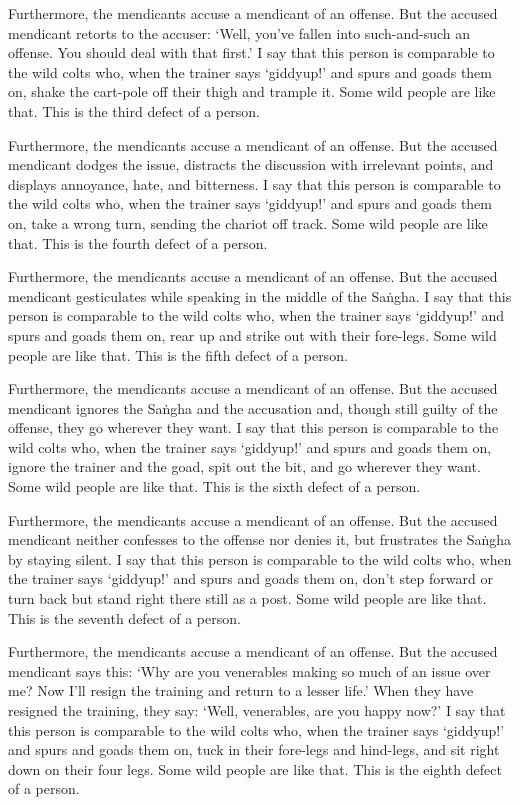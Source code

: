 \documentclass[12pt,openany]{book}%
\begin{document}
Furthermore, the mendicants accuse a mendicant of an offense. But the accused mendicant retorts to the accuser: ‘Well, you’ve fallen into such-and-such an offense. You should deal with that first.’ I say that this person is comparable to the wild colts who, when the trainer says ‘giddyup!’ and spurs and goads them on, shake the cart-pole off their thigh and trample it. Some wild people are like that. This is the third defect of a person. 

Furthermore, the mendicants accuse a mendicant of an offense. But the accused mendicant dodges the issue, distracts the discussion with irrelevant points, and displays annoyance, hate, and bitterness. I say that this person is comparable to the wild colts who, when the trainer says ‘giddyup!’ and spurs and goads them on, take a wrong turn, sending the chariot off track. Some wild people are like that. This is the fourth defect of a person. 

Furthermore, the mendicants accuse a mendicant of an offense. But the accused mendicant gesticulates while speaking in the middle of the \textsanskrit{Saṅgha}. I say that this person is comparable to the wild colts who, when the trainer says ‘giddyup!’ and spurs and goads them on, rear up and strike out with their fore-legs. Some wild people are like that. This is the fifth defect of a person. 

Furthermore, the mendicants accuse a mendicant of an offense. But the accused mendicant ignores the \textsanskrit{Saṅgha} and the accusation and, though still guilty of the offense, they go wherever they want. I say that this person is comparable to the wild colts who, when the trainer says ‘giddyup!’ and spurs and goads them on, ignore the trainer and the goad, spit out the bit, and go wherever they want. Some wild people are like that. This is the sixth defect of a person. 

Furthermore, the mendicants accuse a mendicant of an offense. But the accused mendicant neither confesses to the offense nor denies it, but frustrates the \textsanskrit{Saṅgha} by staying silent. I say that this person is comparable to the wild colts who, when the trainer says ‘giddyup!’ and spurs and goads them on, don’t step forward or turn back but stand right there still as a post. Some wild people are like that. This is the seventh defect of a person. 

Furthermore, the mendicants accuse a mendicant of an offense. But the accused mendicant says this: ‘Why are you venerables making so much of an issue over me? Now I’ll resign the training and return to a lesser life.’ When they have resigned the training, they say: ‘Well, venerables, are you happy now?’ I say that this person is comparable to the wild colts who, when the trainer says ‘giddyup!’ and spurs and goads them on, tuck in their fore-legs and hind-legs, and sit right down on their four legs. Some wild people are like that. This is the eighth defect of a person. 
\end{document}
